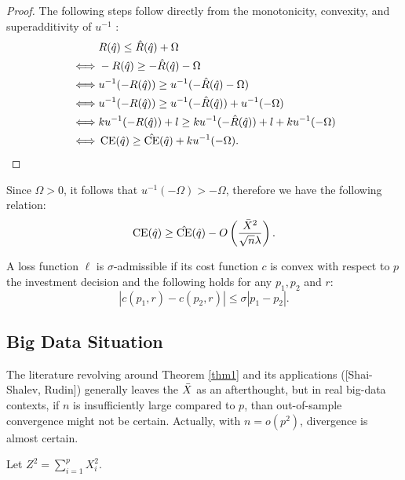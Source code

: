 \documentclass[11pt]{article}
\begin{document}
\begin{proof}
  The following steps follow directly from the monotonicity, convexity, and
  superadditivity of $u^{-1}$ :
  \begin{align*}
    & R(\hat q) \leq \hat R(\hat q) + \Omega\\
    \iff & -R(\hat q) \geq -\hat R(\hat q) - \Omega\\
    \iff & u^{-1}(-R(\hat q)) \geq u^{-1}(-\hat R(\hat q) - \Omega)\\
    \iff & u^{-1}(-R(\hat q)) \geq u^{-1}(-\hat R(\hat q)) + u^{-1}(-\Omega)\\
    \iff & ku^{-1}(-R(\hat q))+l \geq ku^{-1}(-\hat R(\hat q))+l + ku^{-1}(-\Omega)\\
    \iff & \operatorname{CE}(\hat q) \geq \hat{\operatorname{CE}}(\hat q) + ku^{-1}(-\Omega).\qedhere
  \end{align*}
\end{proof}

Since $\Omega>0$, it follows that $u^{-1}(-\Omega) > -\Omega$, therefore we have the
following relation:
\[
  \operatorname{CE}(\hat q) \geq \hat{\operatorname{CE}}(\hat q) - O\left(\frac{\bar X^2}{\sqrt{n}\lambda}\right).
\]

\begin{deff}
  A loss function $\ell$ is $\sigma$-admissible if its cost function $c$ is convex with
  respect to $p$ the investment decision and the following holds for any $p_1,p_2$ and
  $r$:
  \[
    |c(p_1,r) - c(p_2,r)| \leq \sigma|p_1-p_2|.
  \]
\end{deff}


\subsection{Big Data Situation}

The literature revolving around Theorem \ref{thm1} and its applications ([Shai-Shalev,
Rudin]) generally leaves the $\bar X$ as an afterthought, but in real big-data contexts, if
$n$ is insufficiently large compared to $p$, than out-of-sample convergence might not be
certain. Actually, with $n=o(p^2)$, divergence is almost certain. 

Let $Z^2 = \sum_{i=1}^p X_i^2$. 





\end{document}
